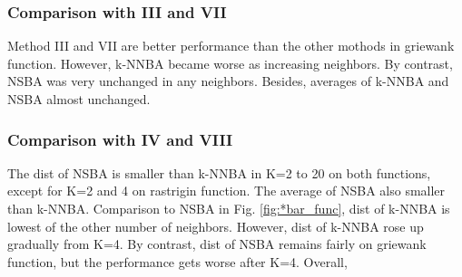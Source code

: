 \subsubsection{Comparison with III and VII}
Method III and VII are better performance than the other mothods in griewank function.
However, k-NNBA became worse as increasing neighbors. By contrast, NSBA was very unchanged in any neighbors. Besides, averages of k-NNBA and NSBA almost unchanged.  

 \subsubsection{Comparison with IV and VIII}
The dist of NSBA is smaller than k-NNBA in K=2 to 20 on both functions, except for K=2 and 4 on rastrigin function. The average of NSBA also smaller than k-NNBA. 
 Comparison to NSBA in Fig. \ref{fig:*bar_func}, dist of k-NNBA is lowest of the other number of neighbors. However, dist of k-NNBA rose up gradually from K=4. By contrast, dist of NSBA remains fairly on griewank function, but the performance gets worse after K=4. Overall, 

